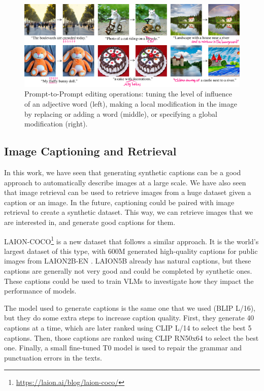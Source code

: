 \begin{figure}[ht]
    \centering
    \includegraphics[width=\linewidth]{images/future/prompt-to-prompt.png}
    \caption{Prompt-to-Prompt editing operations: tuning the level of influence of an adjective word (left), making a local modification in the image by replacing or adding a word (middle), or specifying a global modification (right).}
    \label{fig:prompt-to-prompt}
\end{figure}

\subsection{Image Captioning and Retrieval} \label{sec:image_captioning_retrieval}

In this work, we have seen that generating synthetic captions can be a good approach to automatically describe images at a large scale. We have also seen that image retrieval can be used to retrieve images from a huge dataset given a caption or an image. In the future, captioning could be paired with image retrieval to create a synthetic dataset. This way, we can retrieve images that we are interested in, and generate good captions for them.

LAION-COCO\footnote{\url{https://laion.ai/blog/laion-coco/}} is a new dataset that follows a similar approach. It is the world’s largest dataset of this type, with 600M generated high-quality captions for public images from LAION2B-EN \cite{schuhmann2022laionb}. LAION5B already has natural captions, but these captions are generally not very good and could be completed by synthetic ones. These captions could be used to train VLMs to investigate how they impact the performance of models.

The model used to generate captions is the same one that we used (BLIP L/16), but they do some extra steps to increase caption quality. First, they generate 40 captions at a time, which are later ranked using CLIP L/14 to select the best 5 captions. Then, those captions are ranked using CLIP RN50x64 to select the best one. Finally, a small fine-tuned T0 model is used to repair the grammar and punctuation errors in the texts.

